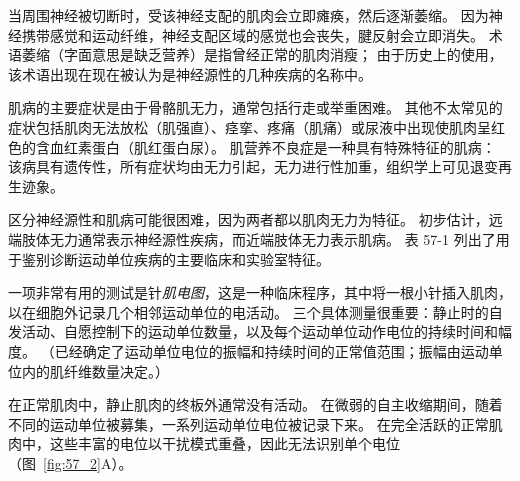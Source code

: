 当周围神经被切断时，受该神经支配的肌肉会立即瘫痪，然后逐渐萎缩。
因为神经携带感觉和运动纤维，神经支配区域的感觉也会丧失，腱反射会立即消失。
术语萎缩（字面意思是缺乏营养）是指曾经正常的肌肉消瘦；
由于历史上的使用，该术语出现在现在被认为是神经源性的几种疾病的名称中。


肌病的主要症状是由于骨骼肌无力，通常包括行走或举重困难。
其他不太常见的症状包括肌肉无法放松（肌强直）、痉挛、疼痛（肌痛）或尿液中出现使肌肉呈红色的含血红素蛋白（肌红蛋白尿）。
肌营养不良症是一种具有特殊特征的肌病：
该病具有遗传性，所有症状均由无力引起，无力进行性加重，组织学上可见退变再生迹象。


区分神经源性和肌病可能很困难，因为两者都以肌肉无力为特征。
初步估计，远端肢体无力通常表示神经源性疾病，而近端肢体无力表示肌病。
表 57-1 列出了用于鉴别诊断运动单位疾病的主要临床和实验室特征。


一项非常有用的测试是针\textit{肌电图}，这是一种临床程序，其中将一根小针插入肌肉，以在细胞外记录几个相邻运动单位的电活动。
三个具体测量很重要：静止时的自发活动、自愿控制下的运动单位数量，以及每个运动单位动作电位的持续时间和幅度。
（已经确定了运动单位电位的振幅和持续时间的正常值范围；振幅由运动单位内的肌纤维数量决定。）


在正常肌肉中，静止肌肉的终板外通常没有活动。
在微弱的自主收缩期间，随着不同的运动单位被募集，一系列运动单位电位被记录下来。
在完全活跃的正常肌肉中，这些丰富的电位以干扰模式重叠，因此无法识别单个电位（图~\ref{fig:57_2}A）。


